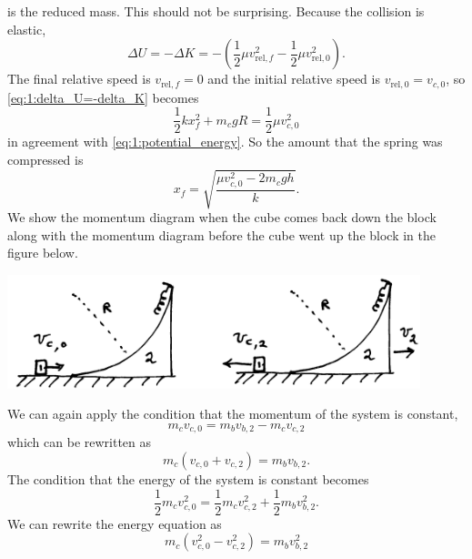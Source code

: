 \documentclass[solutions]{esg8012exam}
\begin{document}
  is the reduced mass. This should not be surprising. Because the collision is elastic,
  \begin{equation} \Delta U = -\Delta K = -\left(\frac12 \mu v_{\text{rel},f}^2 - \frac12 \mu v_{\text{rel},0}^2\right). \label{eq:1:delta_U=-delta_K} \end{equation}
  The final relative speed is $v_{\text{rel}, f} = 0$ and the initial relative speed is $v_{\text{rel}, 0} = v_{c, 0}$, so \autoref{eq:1:delta_U=-delta_K} becomes
  \begin{equation} \frac12 k x_f^2 + m_c g R = \frac12\mu v_{c,0}^2 \label{eq:1:energy_substituted} \end{equation}
  in agreement with \autoref{eq:1:potential_energy}. So the amount that the spring was compressed is
  \begin{equation} x_f = \sqrt{\frac{\mu v_{c,0}^2 - 2m_c g h}{k}}. \label{eq:1:x_f} \end{equation}
  We show the momentum diagram when the cube comes back down the block along with the momentum diagram before the cube went up the block in the figure below.
  \begin{center}\includegraphics[width=0.9\textwidth]{exam2_s1_2}\end{center}
  We can again apply the condition that the momentum of the system is constant,
  \begin{equation} m_c v_{c,0} = m_b v_{b, 2} - m_c v_{c, 2} \label{eq:1:constant_momentum} \end{equation}
  which can be rewritten as
  \begin{equation} m_c(v_{c,0} + v_{c, 2}) = m_b v_{b,2}. \label{eq:1:momentum_constant_rewritten} \end{equation}
  The condition that the energy of the system is constant becomes
  \begin{equation} \frac{1}{2}m_c v_{c,0}^2=\frac{1}{2}m_c v_{c,2}^2+\frac{1}{2}m_b v_{b,2}^2. \label{eq:1:constant_energy} \end{equation}
  We can rewrite the energy equation as
  \begin{equation} m_c (v_{c,0}^2-v_{c,2}^2)=m_b v_{b,2}^2 \label{eq:1:constant_energy_rewritten} \end{equation}
\end{document}
